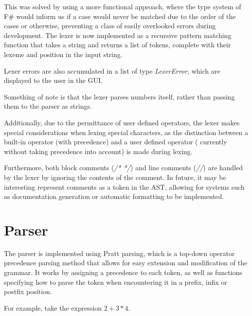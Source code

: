 This was solved by using a more functional approach, where the type system of F\# would inform us if a case would 
never be matched due to the order of the cases or otherwise, preventing a class of easily overlooked errors during development.
The lexer is now implemented as a recursive pattern matching function that takes a string and returns a list of 
tokens, complete with their lexeme and position in the input string.

Lexer errors are also accumulated in a list of type \textit{LexerError}, which are displayed to the user in the GUI\@.

Something of note is that the lexer parses numbers itself, rather than passing them to the parser as strings.

Additionally, due to the permittance of user defined operators, the lexer makes special considerations when lexing 
special characters, as the distinction between a built-in operator (with precedence) and a user defined operator (
currently without taking precedence into account) is made during lexing.

Furthermore, both block comments (\textit{/* */}) and line comments (\textit{//}) are handled by the lexer by ignoring
the contents of the comment.
In future, it may be interesting represent comments as a token in the AST, allowing for systems such as documentation
generation or automatic formatting to be implemented.

\section{Parser}\label{sec:parser}

The parser is implemented using Pratt parsing\citep{pratt1973top}, which is a top-down operator precedence parsing 
method that allows for easy extension and modification of the grammar.
It works by assigning a precedence to each token, as well as functions specifying how to parse the token when 
encountering it in a prefix, infix or postfix position.

For example, take the expression $2 + 3 * 4$.


